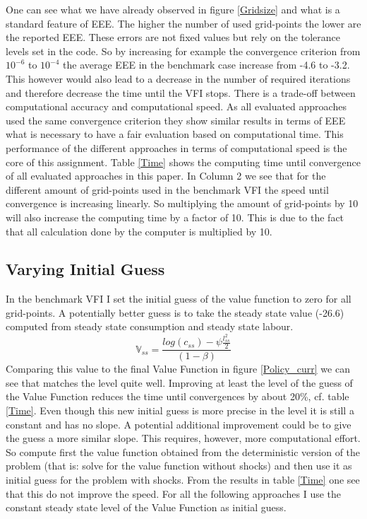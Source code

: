 \documentclass[a4paper,12pt]{article}
\begin{document}
One can see what we have already observed in figure \ref{Gridsize} and what is a standard feature of EEE. The higher the number of used grid-points the lower are the reported EEE. These errors are not fixed values but rely on the tolerance levels set in the code. So by increasing for example the convergence criterion from $10^{-6}$ to $10^{-4}$ the average EEE in the benchmark case increase from -4.6 to -3.2. This however would also lead to a decrease in the number of required iterations and therefore decrease the time until the VFI stops. There is a trade-off between computational accuracy and computational speed. As all evaluated approaches used the same convergence criterion they show similar results in terms of EEE what is necessary to have a fair evaluation based on computational time.
This performance of the different approaches in terms of computational speed is the core of this assignment. Table \ref{Time} shows the computing time until convergence of all evaluated approaches in this paper. In Column 2 we see that for the different amount of grid-points used in the benchmark VFI the speed until convergence is increasing linearly. So multiplying the amount of grid-points by 10 will also increase the computing time by a factor of 10. This is due to the fact that all calculation done by the computer is multiplied by 10. 

\subsection*{Varying Initial Guess}

In the benchmark VFI I set the initial guess of the value function to zero for all grid-points. A potentially better guess is to take the steady state value (-26.6) computed from steady state consumption and steady state labour.
\begin{equation*}
\mathbb{V}_{ss}=\frac{log(c_{ss})-\psi \frac{l_{ss}^{2}}{2}}{(1-\beta)} 
\end{equation*}
Comparing this value to the final Value Function in figure \ref{Policy_curr} we can see that matches the level quite well. Improving at least the level of the guess of the Value Function reduces the time until convergences by about 20\%, cf. table \ref{Time}. Even though this new initial guess is more precise in the level it is still a constant and has no slope. A potential additional improvement could be to give the guess a more similar slope. This requires, however, more computational effort. So compute first the value function obtained from the deterministic version of the problem (that is: solve for the value function without shocks) and then use it as initial guess for the problem with shocks. From the results in table \ref{Time} one see that this do not improve the speed. For all the following approaches I use the constant steady state level of the Value Function as initial guess.
\end{document}
